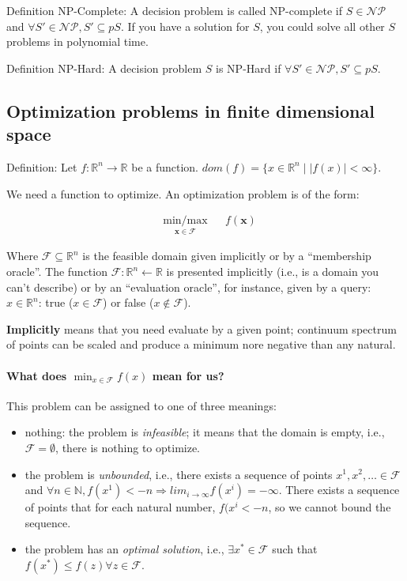\documentclass[main]{subfiles}
\begin{document}
Definition NP-Complete: A decision problem is called NP-complete if $S \in
\mathcal{NP}$ and $\forall S' \in \mathcal{NP}, S' \subseteq pS$. If you have a
solution for $S$, you could solve all other $S$ problems in polynomial time.

Definition NP-Hard: A decision problem $S$ is NP-Hard if $\forall S' \in
\mathcal{NP}, S' \subseteq pS$.


\subsection{Optimization problems in finite dimensional space}
Definition: Let $f: \mathbb{R}^{n} \rightarrow \mathbb{R}$ be a function.
$dom(f) = \{ x \in \mathbb{R}^{n} \mid \left| f(x) \right| < \infty \}$.

We need a function to optimize. An optimization problem is of the form: 

\begin{equation*}
\begin{aligned}
& \underset{\mathbf{x \in \mathcal{F}}}{\text{min/max}}
& & f(\mathbf{x})
\end{aligned}
\label{eq:sampleOptimizationProblem}
\end{equation*}

Where $\mathcal{F} \subseteq \mathbb{R}^{n}$ is the feasible domain given
implicitly or by a ``membership oracle''. The function
$\mathcal{F}: \mathbb{R}^{n} \leftarrow \mathbb{R}$ is presented implicitly
(i.e., is a domain you can't describe) or by an ``evaluation oracle'', for
instance, given by a query: $x \in \mathbb{R}^{n}$: true ($x \in \mathcal{F}$)
or false ($x \notin \mathcal{F}$).

\textbf{Implicitly} means that you need evaluate by a given point; continuum spectrum of points can be scaled and produce a minimum nore negative than any natural.

\paragraph{What does $\displaystyle \min_{x \in \mathcal{F}} f(x)$ mean for us?}
This problem can be assigned to one of three meanings:
\begin{itemize} \label{items:optimization-conclusions}
\item nothing: the problem is \emph{infeasible}; it means that the domain is
empty, i.e., $\mathcal{F} = \emptyset$, there is nothing to optimize.
\item the problem is \emph{unbounded}, i.e., there exists a sequence of
points $x^{1}, x^{2}, \dots \in \mathcal{F}$ and $\forall n \in \mathbb{N},
f(x^{1}) < -n \Rightarrow lim_{i \rightarrow \infty} f(x^{i}) = -\infty$.
There exists a sequence of points that for each natural number, $f(x^{i} < -n$,
so we cannot bound the sequence.
\item the problem has an \emph{optimal solution}, i.e., $\exists x^{*} \in
\mathcal{F}$ such that $f(x^{*}) \leq f(z) \forall z \in \mathcal{F}$.
\end{itemize}
\end{document}
